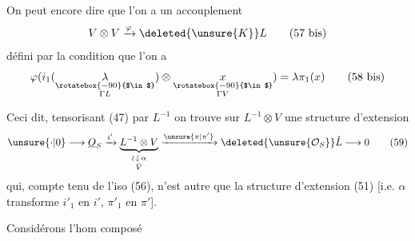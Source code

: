 On peut encore dire que l'on a un
accouplement 
\[
 V\otimes V\xrightarrow{\varphi}\deleted{\unsure{K}}L \tag*{(57 bis)}
\]
défini par la condition que l'on a
\[
\varphi(i_1(\underset{\substack{\rotatebox{-90}{$\in$}\\\Gamma L}}{\lambda})\otimes\underset{\substack{\rotatebox{-90}{$\in$}\\\Gamma V}}{x})=\lambda\pi_1(x) \tag*{(58 bis)}
\]

Ceci dit,  tensorisant (47) par $L^{-1}$
on trouve sur $L^{-1}\otimes V$ une structure
d'extension
\[
\unsure{\cdot|0}\longrightarrow\underline O_S\xrightarrow{i'}\underbrace{L^{-1}\otimes V}_{\substack{\wr\,\downarrow\,\alpha\\\check V}}\xrightarrow{\unsure{\pi|\pi'}}\deleted{\unsure{\mathcal O_S}}\check L\longrightarrow0 \tag*{(59)}
\]
qui, compte tenu de l'iso (56), n'est autre
que la structure d'extension (51) [i.e.
$\alpha$ transforme $i'_1$ en $i'$, $\pi'_1$ en $\pi'$].

Considérons l'hom composé
